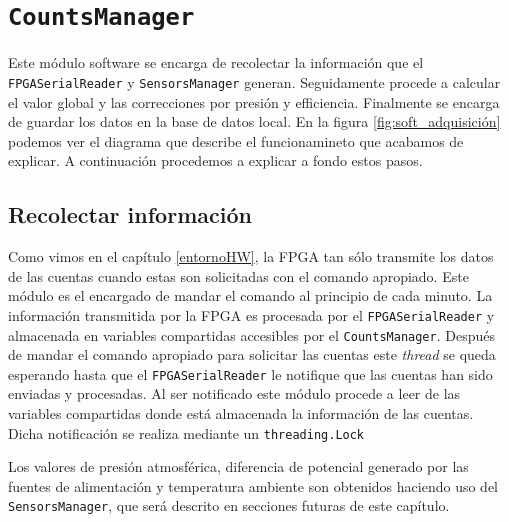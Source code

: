 \section{\texttt{CountsManager}}
	Este módulo software se encarga de recolectar la información que el \texttt{FPGASerialReader} y \texttt{SensorsManager} generan. Seguidamente
	procede a calcular el valor global y las correcciones por presión y efficiencia. Finalmente se encarga de guardar los datos en la base de
	datos local. En la figura \ref{fig:soft_adquisición} podemos ver el diagrama que describe el funcionamineto que acabamos de explicar. A
	continuación procedemos a explicar a fondo estos pasos.
	\subsection{Recolectar información}
		Como vimos en el capítulo \ref{entornoHW}, la FPGA tan sólo transmite los datos de las cuentas cuando estas son solicitadas con el
		comando apropiado. Este módulo es el encargado de mandar el comando al principio de cada minuto. La información transmitida por la
		FPGA es procesada por el \texttt{FPGASerialReader} y almacenada en variables compartidas accesibles por el \texttt{CountsManager}.
		Después de mandar el comando apropiado para solicitar las cuentas este \emph{thread} se queda esperando hasta que el
		\texttt{FPGASerialReader} le notifique que las cuentas han sido enviadas y procesadas. Al ser notificado este módulo procede a leer de
		las variables compartidas donde está almacenada la información de las cuentas. Dicha notificación se realiza mediante un
		\texttt{threading.Lock}
		\par
		Los valores de presión atmosférica, diferencia de potencial generado por las fuentes de alimentación y temperatura ambiente son
		obtenidos haciendo uso del \texttt{SensorsManager}, que será descrito en secciones futuras de este capítulo.
